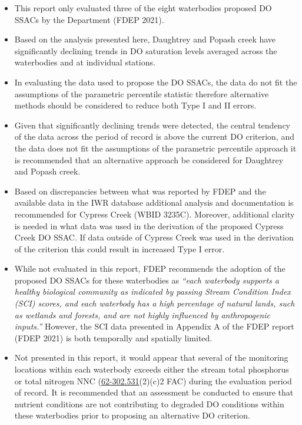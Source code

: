 \documentclass[]{interact}
\theoremstyle{plain}%
\theoremstyle{definition}
\theoremstyle{remark}
\begin{document}
\begin{itemize}
\item
  This report only evaluated three of the eight waterbodies proposed DO
  SSACs by the Department (FDEP 2021).
\item
  Based on the analysis presented here, Daughtrey and Popash creek have
  significantly declining trends in DO saturation levels averaged across
  the waterbodies and at individual stations.
\item
  In evaluating the data used to propose the DO SSACs, the data do not
  fit the assumptions of the parametric percentile statistic therefore
  alternative methods should be considered to reduce both Type I and II
  errors.
\item
  Given that significantly declining trends were detected, the central
  tendency of the data across the period of record is above the current
  DO criterion, and the data does not fit the assumptions of the
  parametric percentile approach it is recommended that an alternative
  approach be considered for Daughtrey and Popash creek.
\item
  Based on discrepancies between what was reported by FDEP and the
  available data in the IWR database additional analysis and
  documentation is recommended for Cypress Creek (WBID 3235C). Moreover,
  additional clarity is needed in what data was used in the derivation
  of the proposed Cypress Creek DO SSAC. If data outside of Cypress
  Creek was used in the derivation of the criterion this could result in
  increased Type I error.
\item
  While not evaluated in this report, FDEP recommends the adoption of
  the proposed DO SSACs for these waterbodies as \emph{``each waterbody
  supports a healthy biological community as indicated by passing Stream
  Condition Index (SCI) scores, and each waterbody has a high percentage
  of natural lands, such as wetlands and forests, and are not highly
  influenced by anthropogenic inputs.''} However, the SCI data presented
  in Appendix A of the FDEP report (FDEP 2021) is both temporally and
  spatially limited.
\item
  Not presented in this report, it would appear that several of the
  monitoring locations within each waterbody exceeds either the stream
  total phosphorus or total nitrogen NNC
  (\href{https://www.flrules.org/gateway/ruleno.asp?id=62-302.531}{62-302.531}(2)(c)2
  FAC) during the evaluation period of record. It is recommended that an
  assessment be conducted to ensure that nutrient conditions are not
  contributing to degraded DO conditions within these waterbodies prior
  to proposing an alternative DO criterion.
\end{itemize}
\end{document}

